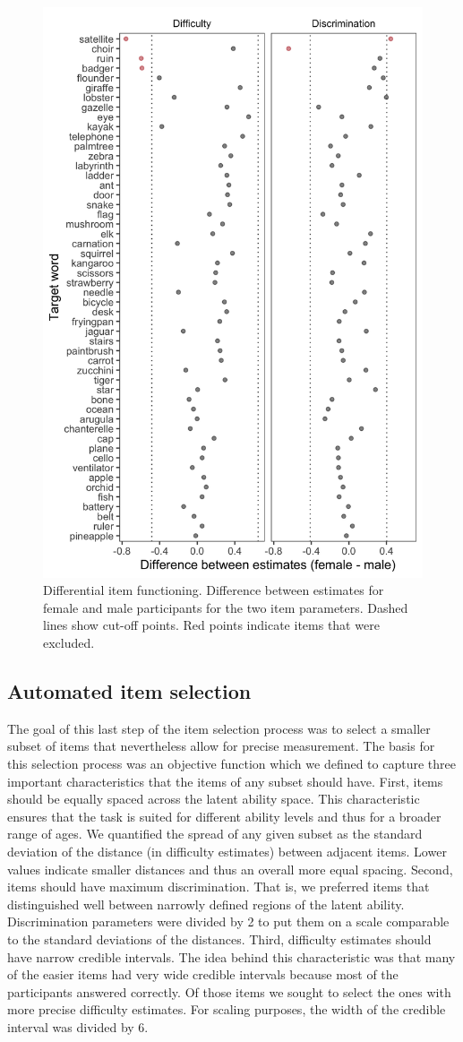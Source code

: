 \documentclass[
  man,floatsintext]{apa6}
\begin{document}
\begin{figure}

{\centering \includegraphics[width=0.5\linewidth]{../graphs/dif_fig} 

}

\caption{Differential item functioning. Difference between estimates for female and male participants for the two item parameters. Dashed lines show cut-off points. Red points indicate items that were excluded.}\label{fig:fig3}
\end{figure}

\hypertarget{automated-item-selection}{%
\subsection{Automated item selection}\label{automated-item-selection}}

The goal of this last step of the item selection process was to select a smaller subset of items that nevertheless allow for precise measurement. The basis for this selection process was an objective function which we defined to capture three important characteristics that the items of any subset should have. First, items should be equally spaced across the latent ability space. This characteristic ensures that the task is suited for different ability levels and thus for a broader range of ages. We quantified the spread of any given subset as the standard deviation of the distance (in difficulty estimates) between adjacent items. Lower values indicate smaller distances and thus an overall more equal spacing. Second, items should have maximum discrimination. That is, we preferred items that distinguished well between narrowly defined regions of the latent ability. Discrimination parameters were divided by 2 to put them on a scale comparable to the standard deviations of the distances. Third, difficulty estimates should have narrow credible intervals. The idea behind this characteristic was that many of the easier items had very wide credible intervals because most of the participants answered correctly. Of those items we sought to select the ones with more precise difficulty estimates. For scaling purposes, the width of the credible interval was divided by 6.
\end{document}
